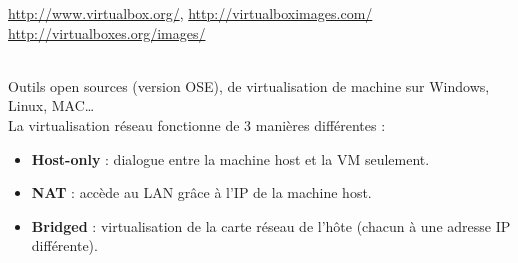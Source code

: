 \documentclass[a4paper,11pt]{article}				    %
\begin{document}
{
\url{http://www.virtualbox.org/}, \url{http://virtualboximages.com/}\\
\url{http://virtualboxes.org/images/}
}
{
\\Outils open sources (version OSE), de virtualisation de machine sur Windows, Linux, MAC\dots{}\\
La virtualisation r\'eseau fonctionne de 3 mani\`eres diff\'erentes :{\small
\begin{itemize}
	\item \textbf{Host-only} : dialogue entre la machine host et la VM seulement.
	\item \textbf{NAT} : acc\`ede au LAN gr\^ace \`a l'IP de la machine host.
	\item \textbf{Bridged} : virtualisation de la carte r\'eseau de l'h\^ote (chacun \`a une adresse IP diff\'erente).
\end{itemize}}
}
\end{document}
